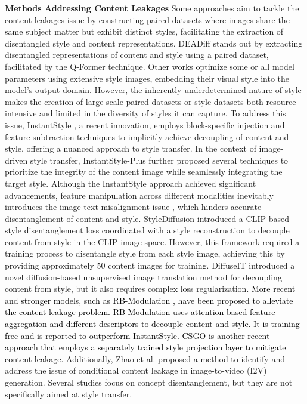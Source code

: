\textbf{Methods Addressing Content Leakages}
Some approaches \citep{zhang2018separating, zhang2018unifiedframeworkgeneralizablestyle, qi2024deadiff} aim to tackle the content leakages issue by constructing paired datasets where images share the same subject matter but exhibit distinct styles, facilitating the extraction of disentangled style and content representations. DEADiff \citep{qi2024deadiff} stands out by extracting disentangled representations of content and style using a paired dataset, facilitated by the Q-Former \citep{li2023blip} technique.
Other works \citep{sohn2024styledrop, liu2023stylecrafter} optimize some or all model parameters using extensive style images, embedding their visual style into the model’s output domain. However, the inherently underdetermined nature of style makes the creation of large-scale paired datasets or style datasets both resource-intensive and limited in the diversity of styles it can capture. To address this issue, InstantStyle \citep{wang2024instantstyle}, a recent innovation, employs block-specific injection and feature subtraction techniques to implicitly achieve decoupling of content and style, offering a nuanced approach to style transfer. In the context of image-driven style transfer, InstantStyle-Plus \citep{wang2024instantstyle-plus} further proposed several techniques to prioritize the integrity of the content image while seamlessly integrating the target style. 
Although the InstantStyle approach achieved significant advancements, feature manipulation across different modalities inevitably introduces the image-text misalignment issue \citep{Misalign, gordon2023mismatch}, which hinders accurate disentanglement of content and style. 
StyleDiffusion \citep{wang2023stylediffusion} introduced a CLIP-based style disentanglement loss coordinated with a style reconstruction to decouple content from style in the CLIP image space. However, this framework required a training process to disentangle style from each style image, achieving this by providing approximately 50 content images for training.
DiffuseIT \citep{kwon2022diffusion} introduced a novel diffusion-based unsupervised image translation method for decoupling content from style, but it also requires complex loss regularization.
\textcolor{black}{More recent and stronger models, such as RB-Modulation \citep{rout2024rb}, have been proposed to alleviate the content leakage problem. RB-Modulation uses attention-based feature aggregation and different descriptors to decouple content and style. It is training-free and is reported to outperform InstantStyle. CSGO \citep{xing2024csgo} is another recent approach that employs a separately trained style projection layer to mitigate content leakage.}
Additionally, Zhao et al. \citep{zhao2024identifying} proposed a method to identify and address the issue of conditional content leakage in image-to-video (I2V) generation. Several studies \citep{motamed2023lego, huang2024learning, le2022styleid} focus on concept disentanglement, but they are not specifically aimed at style transfer.

